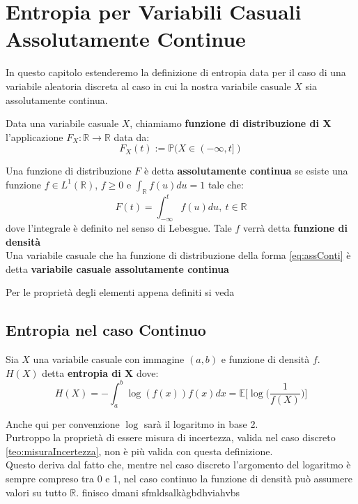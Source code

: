 \chapter{Entropia per Variabili Casuali Assolutamente Continue}
In questo capitolo estenderemo la definizione di entropia data per il caso di una variabile aleatoria discreta al caso in cui la nostra variabile casuale $X$ sia assolutamente continua.

\begin{defi}
Data una variabile casuale $X$, chiamiamo \textbf{funzione di distribuzione di X} l'applicazione $F_X: \mathbb{R} \to \mathbb{R}$ data da:
$$F_X(t):= \mathbb{P}(X \in (-\infty,t])$$
\end{defi}
\begin{defi}
Una funzione di distribuzione $F$ è detta \textbf{assolutamente continua} se esiste una funzione $f \in L^1(\mathbb{R})$, $f\geq 0$ e $\int_{\mathbb{R}} f(u)du=1$ tale che:
\begin{equation}\label{eq:assConti}
F(t)=\int_{-\infty }^t f(u)du, \  t\in \mathbb{R}
\end{equation}
dove l'integrale è definito nel senso di Lebesgue. Tale $f$ verrà detta \textbf{funzione di densità}\\
Una variabile casuale che ha funzione di distribuzione della forma \ref{eq:assConti} è detta \textbf{variabile casuale assolutamente continua}
\end{defi}
Per le proprietà degli elementi appena definiti si veda \cite{Mazzucchi}

\section{Entropia nel caso Continuo}
\label{sec:EntropiaContinuo}
\begin{defi}
Sia $X$ una variabile casuale con immagine $(a,b)$ e funzione di densità $f$. $H(X)$ detta \textbf{entropia di X} dove:
$$H(X)=-\int_a^b \log(f(x))f(x)dx= \mathbb{E}\bigg[ \log \bigg( \frac{1}{f(X)} \bigg) \bigg]$$
\end{defi}
Anche qui per convenzione $\log$ sarà il logaritmo in base 2.\\
Purtroppo la proprietà di essere misura di incertezza, valida nel caso discreto \ref{teo:misuraIncertezza}, non è più valida con questa definizione.\\
Questo deriva dal fatto che, mentre nel caso discreto l'argomento del logaritmo è sempre compreso tra 0 e 1, nel caso continuo la funzione di densità può assumere valori su tutto $\mathbb{R}$. finisco dmani
 sfmldsalkàgbdhviahvbs







